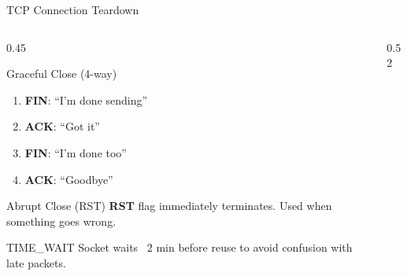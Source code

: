 \documentclass[aspectratio=169]{beamer}  %
\begin{document}
\begin{frame}{TCP Connection Teardown}
    \begin{columns}[T]
        \begin{column}{0.45\textwidth}
            \begin{block}{Graceful Close (4-way)}
                \small
                \begin{enumerate}\setlength{\itemsep}{1pt}
                    \item \textbf{FIN}: ``I'm done sending''
                    \item \textbf{ACK}: ``Got it''
                    \item \textbf{FIN}: ``I'm done too''
                    \item \textbf{ACK}: ``Goodbye''
                \end{enumerate}
            \end{block}
            
            \vspace{0.2em}
            \begin{alertblock}{Abrupt Close (RST)}
                \small
                \textbf{RST} flag immediately terminates. Used when something goes wrong.
            \end{alertblock}
            
            \vspace{0.2em}
            \begin{exampleblock}{TIME\_WAIT}
                \small
                Socket waits ~2 min before reuse to avoid confusion with late packets.
            \end{exampleblock}
        \end{column}
        \begin{column}{0.52\textwidth}
            \begin{center}
\end{center}
\end{column}
\end{columns}
\end{frame}
\end{document}
